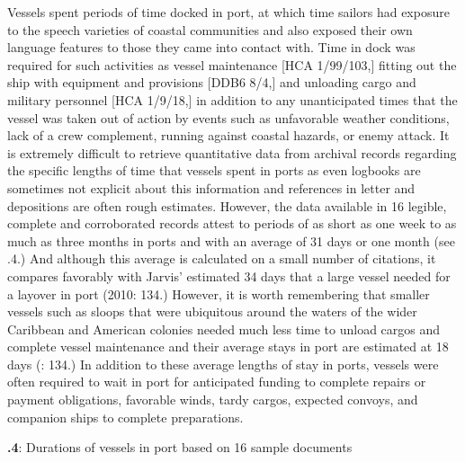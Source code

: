 Vessels spent periods of time docked in port, at which time sailors had exposure to the speech varieties of coastal communities and also exposed their own language features to those they came into contact with. Time in dock was required for such activities as vessel maintenance [HCA 1/99/103,] fitting out the ship with equipment and provisions [DDB6 8/4,] and unloading cargo and military personnel [HCA 1/9/18,] in addition to any unanticipated times that the vessel was taken out of action by events such as unfavorable weather conditions, lack of a crew complement, running against coastal hazards, or enemy attack. It is extremely difficult to retrieve quantitative data from archival records regarding the specific lengths of time that vessels spent in ports as even logbooks are sometimes not explicit about this information and references in letter and depositions are often rough estimates. However, the data available in 16 legible, complete and corroborated records attest to periods of as short as one week to as much as three months in ports and with an average of 31 days or one month (see .4.) And although this average is calculated on a small number of citations, it compares favorably with Jarvis’ estimated 34 days that a large vessel needed for a layover in port (2010: 134.) However, it is worth remembering that smaller vessels such as sloops that were ubiquitous around the waters of the wider Caribbean and American colonies needed much less time to unload cargos and complete vessel maintenance and their average stays in port are estimated at 18 days (\citealt{Jarvis2010}: 134.) In addition to these average lengths of stay in ports, vessels were often required to wait in port for anticipated funding to complete repairs or payment obligations, favorable winds, tardy cargos, expected convoys, and companion ships to complete preparations. 

\textbf{.4}: Durations of vessels in port based on 16 sample documents

\tablefirsthead{}

